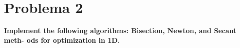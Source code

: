 \section*{Problema 2}
\textbf{Implement the following algorithms: Bisection, Newton, and Secant meth-
    ods for optimization in 1D.}